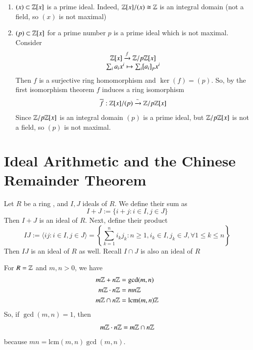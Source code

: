 \documentclass[12pt, a4paper, oneside, openright, titlepage]{book}
\begin{document}
\begin{eg}
    \leavevmode
    \begin{enumerate}
        \item $(x) \subset \mathbb Z[x]$ is a prime ideal. Indeed, $\mathbb Z[x]/(x) \cong \mathbb Z$ is an integral domain (not a field, so $(x)$ is not maximal)
        \item $(p) \subset \mathbb Z[x]$ for a prime number $p$ is a prime ideal which is not maximal. Consider \begin{equation}
            \begin{array}{c} \mathbb Z[x] \xrightarrow{f} {\mathbb Z/p\mathbb Z[x]} \\ \sum_ia_ix^i\mapsto \sum_i[a_i]_px^i \end{array}
        \end{equation}
        Then $f$ is a surjective ring homomorphism and $\ker(f) = (p)$. So, by the first isomorphism theorem $f$ induces a ring isomorphism \begin{equation}
            \overline{f}: \mathbb Z[x]/(p) \xrightarrow{\sim} \mathbb Z/p\mathbb Z[x]
        \end{equation}
        Since $\mathbb Z/p\mathbb Z[x]$ is an integral domain $(p)$ is a prime ideal, but $\mathbb Z/p\mathbb Z[x]$ is not a field, so $(p)$ is not maximal.
    \end{enumerate}
\end{eg}


\section{\textsection Ideal Arithmetic and the Chinese Remainder Theorem}

\begin{defn}
    Let $R$ be a ring , and $I,J$ ideals of $R$. We define their sum as \begin{equation}
        I + J := \{i+j:i\in I, j \in J\}
    \end{equation}
    Then $I + J$ is an ideal of $R$. Next, define their product \begin{equation}
        IJ := \langle ij: i \in I, j \in J\rangle = \left\{\sum\limits_{k=1}^ni_kj_k: n \geq 1, i_k \in I, j_k \in J, \forall1 \leq k \leq n\right\}
    \end{equation}
    Then $IJ$ is an ideal of $R$ as well. Recall $I \cap J$ is also an ideal of $R$
\end{defn}

\begin{eg}
    For $R = \mathbb Z$ and $m,n > 0$, we have \begin{align}
        m\mathbb Z + n\mathbb Z &= \gcd(m,n) \\
        m\mathbb Z\cdot n\mathbb Z &= mn\mathbb Z \\
        m\mathbb Z \cap n\mathbb Z &= \text{lcm}(m,n)\mathbb Z
    \end{align}
    So, if $\gcd(m,n) = 1$, then $$m\mathbb Z\cdot n\mathbb Z = m\mathbb Z \cap n\mathbb Z$$
    because $mn = \text{lcm}(m,n)\gcd(m,n)$.
\end{eg}
\end{document}
